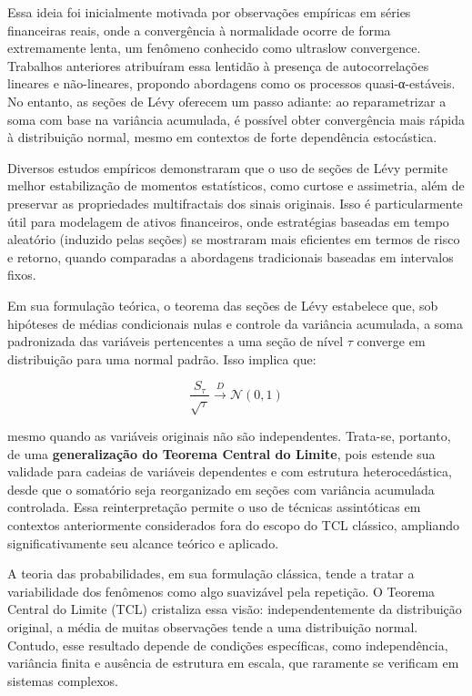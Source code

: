 \documentclass[
]{agujournal2019}
\begin{document}
Essa ideia foi inicialmente motivada por observações empíricas em séries
financeiras reais, onde a convergência à normalidade ocorre de forma
extremamente lenta, um fenômeno conhecido como ultraslow convergence.
Trabalhos anteriores atribuíram essa lentidão à presença de
autocorrelações lineares e não-lineares, propondo abordagens como os
processos quasi-α-estáveis. No entanto, as seções de Lévy oferecem um
passo adiante: ao reparametrizar a soma com base na variância acumulada,
é possível obter convergência mais rápida à distribuição normal, mesmo
em contextos de forte dependência estocástica.

Diversos estudos empíricos demonstraram que o uso de seções de Lévy
permite melhor estabilização de momentos estatísticos, como curtose e
assimetria, além de preservar as propriedades multifractais dos sinais
originais. Isso é particularmente útil para modelagem de ativos
financeiros, onde estratégias baseadas em tempo aleatório (induzido
pelas seções) se mostraram mais eficientes em termos de risco e retorno,
quando comparadas a abordagens tradicionais baseadas em intervalos
fixos.

Em sua formulação teórica, o teorema das seções de Lévy estabelece que,
sob hipóteses de médias condicionais nulas e controle da variância
acumulada, a soma padronizada das variáveis pertencentes a uma seção de
nível \(\tau\) converge em distribuição para uma normal padrão. Isso
implica que:

\[
\frac{S_\tau}{\sqrt{\tau}} \xrightarrow{D} \mathcal{N}(0, 1)
\]

mesmo quando as variáveis originais não são independentes. Trata-se,
portanto, de uma \textbf{generalização do Teorema Central do Limite},
pois estende sua validade para cadeias de variáveis dependentes e com
estrutura heterocedástica, desde que o somatório seja reorganizado em
seções com variância acumulada controlada. Essa reinterpretação permite
o uso de técnicas assintóticas em contextos anteriormente considerados
fora do escopo do TCL clássico, ampliando significativamente seu alcance
teórico e aplicado.

A teoria das probabilidades, em sua formulação clássica, tende a tratar
a variabilidade dos fenômenos como algo suavizável pela repetição. O
Teorema Central do Limite (TCL) cristaliza essa visão: independentemente
da distribuição original, a média de muitas observações tende a uma
distribuição normal. Contudo, esse resultado depende de condições
específicas, como independência, variância finita e ausência de
estrutura em escala, que raramente se verificam em sistemas complexos.
\end{document}
